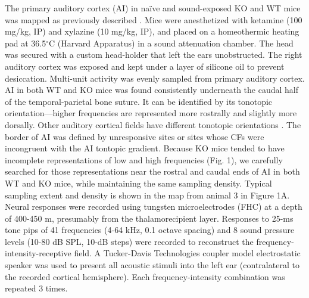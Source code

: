 The primary auditory cortex (AI) in na\"ive and sound-exposed KO and WT mice was mapped as previously described \cite{Kim2009}. Mice were anesthetized with ketamine (100 mg/kg, IP) and xylazine (10 mg/kg, IP), and placed on a homeothermic heating pad at 36.5$^\circ$C (Harvard Apparatus) in a sound attenuation chamber. The head was secured with a custom head-holder that left the ears unobstructed. The right auditory cortex was exposed and kept under a layer of silicone oil to prevent desiccation. Multi-unit activity was evenly sampled from primary auditory cortex. AI in both WT and KO mice was found consistently underneath the caudal half of the temporal-parietal bone suture. It can be identified by its tonotopic orientation---higher frequencies are represented more rostrally and slightly more dorsally. Other auditory cortical fields have different tonotopic orientations \cite{Guo2012}. The border of AI was defined by unresponsive sites or sites whose CFs were incongruent with the AI tontopic gradient. Because KO mice tended to have incomplete representations of low and high frequencies (Fig. 1), we carefully searched for those representations near the rostral and caudal ends of AI in both WT and KO mice, while maintaining the same sampling density. Typical sampling extent and density is shown in the map from animal 3 in Figure 1A. Neural responses were recorded using tungsten microelectrodes (FHC) at a depth of 400-450 \textmu m, presumably from the thalamorecipient layer. Responses to 25-ms tone pips of 41 frequencies (4-64 kHz, 0.1 octave spacing) and 8 sound pressure levels (10-80 dB SPL, 10-dB steps) were recorded to reconstruct the frequency-intensity-receptive field. A Tucker-Davis Technologies coupler model electrostatic speaker was used to present all acoustic stimuli into the left ear (contralateral to the recorded cortical hemisphere). Each frequency-intensity combination was repeated 3 times.

